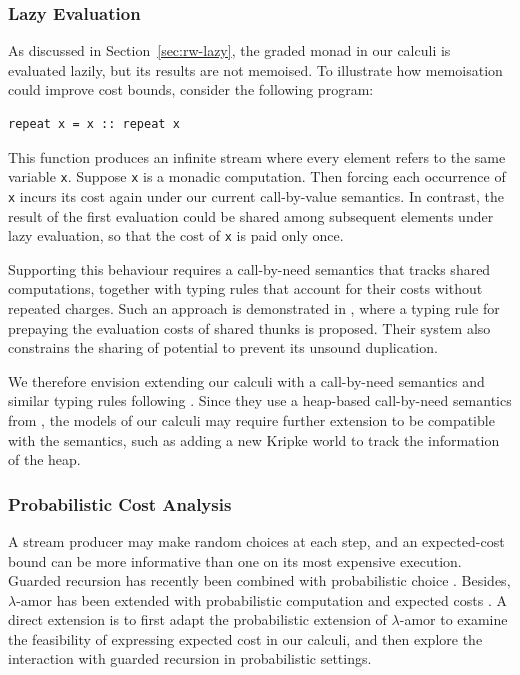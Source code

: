 \subsubsection{Lazy Evaluation}
As discussed in Section~\ref{sec:rw-lazy}, the graded monad in our calculi is evaluated lazily, but its results are not memoised. To illustrate how memoisation could improve cost bounds, consider the following program:
\begin{lstlisting}[style=hs]
repeat x = x :: repeat x
\end{lstlisting}
This function produces an infinite stream where every element refers to the same variable \texttt{x}. Suppose \texttt{x} is a monadic computation. Then forcing each occurrence of \texttt{x} incurs its cost again under our current call-by-value semantics. 
In contrast, 
the result of the first evaluation could be shared among subsequent elements under lazy evaluation, so that the cost of \texttt{x} is paid only once.

Supporting this behaviour requires a call-by-need semantics that 
tracks shared computations, together with typing rules that account for their costs without repeated charges. 
Such an approach is demonstrated in \citet{jostTypeBasedCostAnalysis2017a}, where a typing rule for prepaying the evaluation costs of shared thunks is proposed.
Their system also constrains the sharing of potential to prevent its unsound duplication.

We therefore envision extending our calculi with a call-by-need semantics and similar typing rules following \cite{jostTypeBasedCostAnalysis2017a}. 
Since they use a heap-based call-by-need semantics from \cite{sestoftDerivingLazyAbstract1997a}, the models of our calculi may require further extension to be compatible with the semantics,
such as adding a new Kripke world to track the information of the heap.

\subsubsection{Probabilistic Cost Analysis}
A stream producer may make random choices at each step, and an expected-cost bound can be more informative than one on its most expensive execution. 
Guarded recursion has recently been combined with probabilistic choice \citep{StassenMZAB25}.
Besides, $\lambda$-amor has been extended with probabilistic computation and expected costs \citep{rajani24}. 
A direct extension is to first adapt the probabilistic extension of $\lambda$-amor to examine the feasibility 
of expressing expected cost in our calculi, and then explore the interaction with guarded recursion in probabilistic settings.

